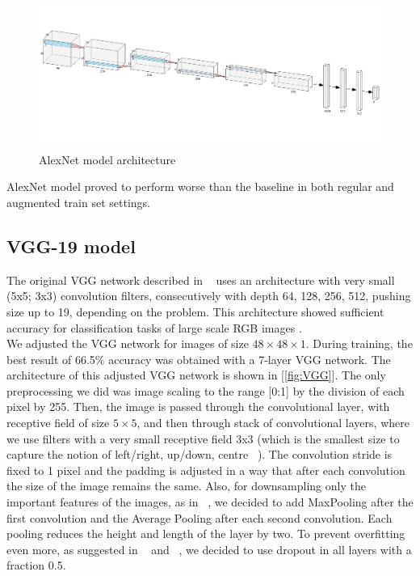 \begin{figure}
	\centering
	\includegraphics[width=\textwidth]{../images/alexnet-architecture.png}
	\caption{AlexNet model architecture}
	\label{fig:alexnet}
\end{figure}

AlexNet model proved to perform worse than the baseline in both regular and augmented train set settings.

\subsection{VGG-19 model}

The original VGG network described in ~\cite{VGG} uses an architecture with very small (5x5; 3x3) convolution filters, consecutively with depth 64, 128, 256, 512, pushing size up to 19, depending on the problem. This architecture showed sufficient accuracy for classification tasks of large scale RGB images .\\

We adjusted the VGG network for images of size $48\times48\times1$. During training, the best result of 66.5\% accuracy was obtained with a 7-layer VGG network. The architecture of this adjusted VGG network is shown in [\ref{fig:VGG}]. The only preprocessing we did was image scaling to the range [0:1] by the division of each pixel by 255. Then, the image is passed through the convolutional layer, with receptive field of size $5\times5$, and then through  stack of convolutional layers, where we use filters with a very small receptive field 3x3 (which is the smallest size to capture the notion of left/right, up/down, centre ~\cite{VGG}). The convolution stride is fixed to 1 pixel and the padding is adjusted in a way that after each convolution the size of the image remains the same. Also, for downsampling only the important features of the images, as in ~\cite{MaxOut}, we decided to add MaxPooling after the first convolution and the Average Pooling after each second convolution. Each pooling reduces the height and length of the layer by two. To prevent overfitting even more, as suggested in ~\cite{DropOut} and ~\cite{DropOutOverfit}, we decided to use dropout in all layers with a fraction 0.5.\\

